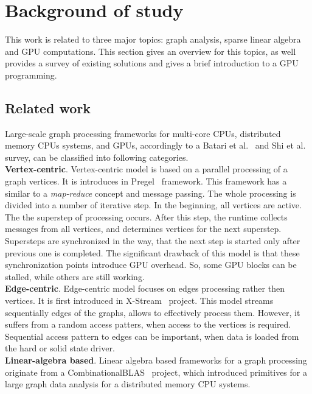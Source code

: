 \section{Background of study}

This work is related to three major topics: graph analysis, sparse linear algebra and GPU computations. This section gives an overview for this topics, as well provides a survey of existing solutions and gives a brief introduction to a GPU programming.

\subsection{Related work}

Large-scale graph processing frameworks for multi-core CPUs, distributed memory CPUs systems, and GPUs, accordingly to a Batari et al.~\cite{article:batarfi_survey_graphs} and Shi et al.~\cite{article:shi_survey_graphs} survey, can be classified into following categories.\\

\textbf{Vertex-centric}. Vertex-centric model is based on a parallel processing of a graph vertices. It is introduces in Pregel~\cite{article:pregel} framework. This framework has a similar to a \textit{map-reduce} concept and message passing. The whole processing is divided into a number of iterative step. In the beginning, all vertices are active. The the superstep of processing occurs. After this step, the runtime collects messages from all vertices, and determines vertices for the next superstep. Supersteps are synchronized in the way, that the next step is started only after previous one is completed. The significant drawback of this model is that these synchronization points introduce GPU overhead. So, some GPU blocks can be stalled, while others are still working.\\   

\textbf{Edge-centric}. Edge-centric model focuses on edges processing rather then vertices. It is first introduced in X-Stream~\cite{article:xstream} project. This model streams sequentially edges of the graphs, allows to effectively process them. However, it suffers from a random access patters, when access to the vertices is required. Sequential access pattern to edges can be important, when data is loaded from the hard or solid state driver.\\

\textbf{Linear-algebra based}. Linear algebra based frameworks for a graph processing originate from a CombinationalBLAS~\cite{article:combblas} project, which introduced primitives for a large graph data analysis for a distributed memory CPU systems. 

